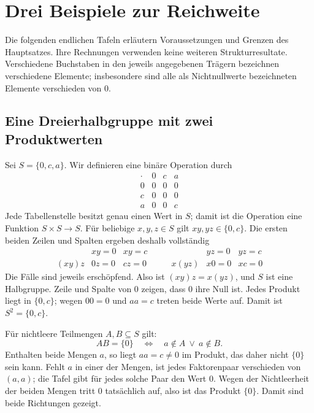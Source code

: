 \chapter{Drei Beispiele zur Reichweite}

Die folgenden endlichen Tafeln erläutern Voraussetzungen und Grenzen des
Hauptsatzes. Ihre Rechnungen verwenden keine weiteren Strukturresultate.
Verschiedene Buchstaben in den jeweils angegebenen Trägern bezeichnen
verschiedene Elemente; insbesondere sind alle als Nichtnullwerte bezeichneten
Elemente verschieden von \(0\).

\section{Eine Dreierhalbgruppe mit zwei Produktwerten}
\hypertarget{nullproducts.example.three}{}

Sei \(S=\{0,c,a\}\). Wir definieren eine binäre Operation durch
\[
\begin{array}{c|ccc}
 \cdot&0&c&a\\\hline
 0&0&0&0\\
 c&0&0&0\\
 a&0&0&c
\end{array}
\]
Jede Tabellenstelle besitzt genau einen Wert in \(S\); damit ist die
Operation eine Funktion \(S\times S\to S\). Für beliebige
\(x,y,z\in S\) gilt \(xy,yz\in\{0,c\}\). Die ersten beiden
Zeilen und Spalten ergeben deshalb vollständig
\[
\begin{array}{c|cc}
 &xy=0&xy=c\\\hline
 (xy)z&0z=0&cz=0
\end{array}
\qquad
\begin{array}{c|cc}
 &yz=0&yz=c\\\hline
 x(yz)&x0=0&xc=0
\end{array}
\]
Die Fälle sind jeweils erschöpfend. Also ist \((xy)z=x(yz)\), und
\(S\) ist eine Halbgruppe. Zeile und Spalte von \(0\) zeigen, dass
\(0\) ihre Null ist. Jedes Produkt liegt in \(\{0,c\}\); wegen
\(00=0\) und \(aa=c\) treten beide Werte auf. Damit ist
\(S^2=\{0,c\}\).

Für nichtleere Teilmengen \(A,B\subseteq S\) gilt:
\[
 AB=\{0\}\quad\Longleftrightarrow\quad
 a\notin A\ \lor\ a\notin B.
\]
Enthalten beide Mengen \(a\), so liegt \(aa=c\ne0\) im Produkt,
das daher nicht \(\{0\}\) sein kann. Fehlt \(a\) in einer der
Mengen, ist jedes Faktorenpaar verschieden von \((a,a)\); die Tafel
gibt für jedes solche Paar den Wert \(0\). Wegen der Nichtleerheit der
beiden Mengen tritt \(0\) tatsächlich auf, also ist das Produkt
\(\{0\}\). Damit sind beide Richtungen gezeigt.

